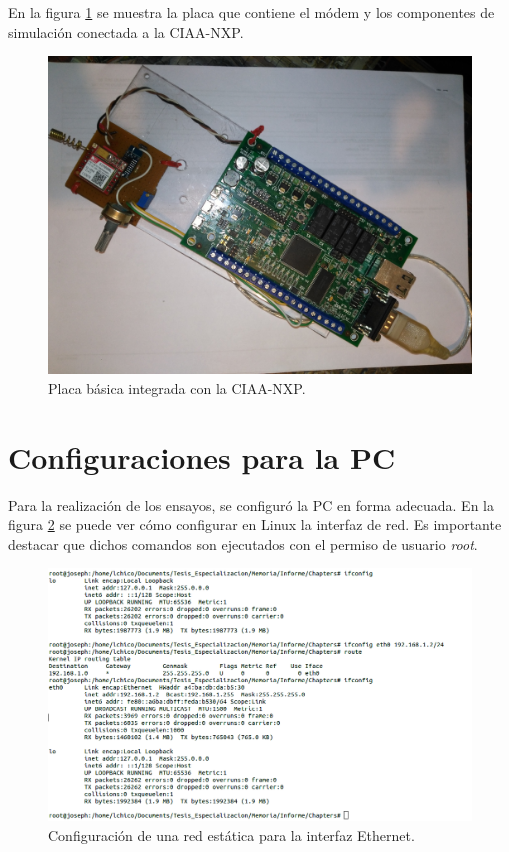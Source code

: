 En la figura \ref{fig:prototipo} se muestra la placa que contiene el módem y los componentes de simulación conectada a la CIAA-NXP. 

\begin{figure}[h]
  \centering
  \includegraphics[scale=.1]{./Figures/prototipo.jpg}
  \caption{Placa básica integrada con la CIAA-NXP.}
  \label{fig:prototipo}
\end{figure}

\section{Configuraciones para la PC}

Para la realización de los ensayos, se configuró la PC en forma adecuada. En la figura \ref{fig:hw_pc} se puede ver cómo configurar en Linux la interfaz de red. Es importante destacar que dichos comandos son ejecutados con el permiso de usuario \emph{root}.

\begin{figure}[h]
  \centering
  \includegraphics[scale=.45]{./Figures/config_net_console.png}
  \caption{Configuración de una red estática para la interfaz Ethernet.}
  \label{fig:hw_pc}
\end{figure}

